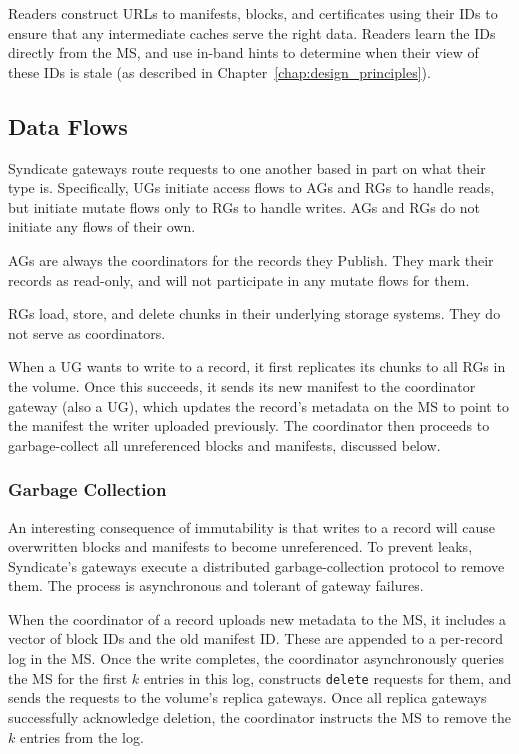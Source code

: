 Readers construct URLs to manifests, blocks, and certificates using their IDs to
ensure that any intermediate caches serve the right data.  Readers learn the IDs
directly from the MS, and use in-band hints to determine when their view of
these IDs is stale (as described in Chapter~\ref{chap:design_principles}).

\subsection{Data Flows}

Syndicate gateways route requests to one another based in part on what their
type is.  Specifically,
UGs initiate access flows to AGs and RGs to handle reads, but initiate mutate
flows only to RGs to handle writes.  AGs and RGs do not initiate any flows of
their own.

AGs are always the coordinators for the records they Publish.  They mark their
records as read-only, and will not participate in any mutate flows for them.

RGs load, store, and delete chunks in their underlying storage systems.  They do
not serve as coordinators.

When a UG wants to write to a record, it first replicates its chunks to all RGs in
the volume.  Once this succeeds, it sends its new manifest to the coordinator
gateway (also a UG), which updates the record's metadata on the MS to point to
the manifest the writer uploaded previously.  The coordinator then proceeds to
garbage-collect all unreferenced blocks and manifests, discussed below.

\subsubsection{Garbage Collection}

An interesting consequence of immutability is that writes to a record will cause
overwritten blocks and manifests to become unreferenced.  To prevent leaks, Syndicate's gateways
execute a distributed garbage-collection protocol to remove them.  The process
is asynchronous and tolerant of gateway failures.

When the coordinator of a record uploads new metadata to the MS, it includes a
vector of block IDs and the old manifest ID.  These are appended to a per-record
log in the MS.  Once the write completes, the coordinator asynchronously queries
the MS for the first $k$ entries in this log, constructs \texttt{delete}
requests for them, and sends the requests to the volume's replica gateways.
Once all replica gateways successfully acknowledge deletion, the coordinator
instructs the MS to remove the $k$ entries from the log.


